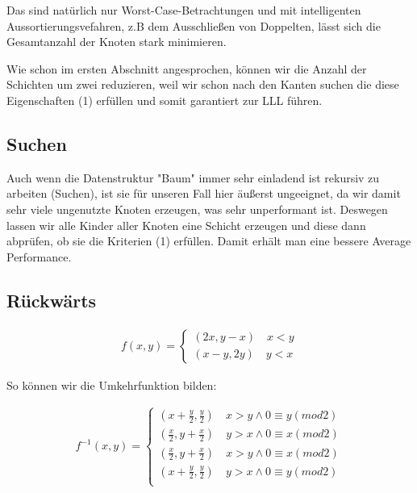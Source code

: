 \documentclass{article}
\begin{document}
Das sind natürlich nur Worst-Case-Betrachtungen und mit intelligenten Aussortierungsvefahren, z.B dem Ausschließen von Doppelten, lässt sich die Gesamtanzahl der Knoten stark minimieren. \newline

Wie schon im ersten Abschnitt angesprochen, können wir die Anzahl der Schichten um zwei reduzieren, weil wir schon nach den Kanten suchen die diese Eigenschaften (1) erfüllen und somit garantiert zur LLL führen.

\subsection*{ Suchen }

Auch wenn die Datenstruktur "Baum" immer sehr einladend ist rekursiv zu arbeiten (Suchen), ist sie für unseren Fall hier äußerst ungeeignet, da wir damit sehr viele ungenutzte Knoten erzeugen, was sehr unperformant ist. Deswegen lassen wir alle Kinder aller Knoten eine Schicht erzeugen und diese dann abprüfen, ob sie die Kriterien (1) erfüllen. Damit erhält man eine bessere Average Performance.

\subsection*{ Rückwärts }


\begin{gather}
    f(x, y) =  
    \begin{cases}
    	(2x, y - x)		\quad x < y \\
    	(x - y, 2y) 		\quad y < x
    \end{cases}
\end{gather}

So können wir die Umkehrfunktion bilden:

\begin{gather}
   	f^{-1}(x, y) =  
    \begin{cases}
    	(x + \frac{y}{2},  \frac{y}{2})		\quad x > y \wedge 0 \equiv y (mod 2) \\
    	(\frac{x}{2},y + \frac{x}{2})		\quad y > x\wedge 0 \equiv x (mod 2) \\
    	(\frac{x}{2}, y + \frac{x}{2})		\quad x > y \wedge 0 \equiv x (mod 2) \\
    	(x + \frac{y}{2}, \frac{y}{2})		\quad y > x\wedge 0 \equiv y (mod 2) \\
    \end{cases}
\end{gather}
\end{document}
